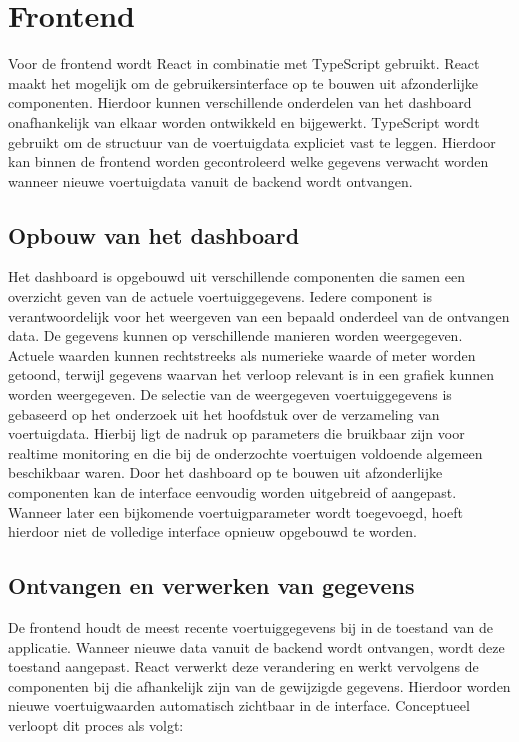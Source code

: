 \section{Frontend}
Voor de frontend wordt React in combinatie met TypeScript gebruikt. React maakt het mogelijk om de gebruikersinterface op te bouwen uit afzonderlijke componenten. Hierdoor kunnen verschillende onderdelen van het dashboard onafhankelijk van elkaar worden ontwikkeld en bijgewerkt.
TypeScript wordt gebruikt om de structuur van de voertuigdata expliciet vast te leggen. Hierdoor kan binnen de frontend worden gecontroleerd welke gegevens verwacht worden wanneer nieuwe voertuigdata vanuit de backend wordt ontvangen.

\subsection{Opbouw van het dashboard}
Het dashboard is opgebouwd uit verschillende componenten die samen een overzicht geven van de actuele voertuiggegevens. Iedere component is verantwoordelijk voor het weergeven van een bepaald onderdeel van de ontvangen data.
De gegevens kunnen op verschillende manieren worden weergegeven. Actuele waarden kunnen rechtstreeks als numerieke waarde of meter worden getoond, terwijl gegevens waarvan het verloop relevant is in een grafiek kunnen worden weergegeven.
De selectie van de weergegeven voertuiggegevens is gebaseerd op het onderzoek uit het hoofdstuk over de verzameling van voertuigdata. Hierbij ligt de nadruk op parameters die bruikbaar zijn voor realtime monitoring en die bij de onderzochte voertuigen voldoende algemeen beschikbaar waren.
Door het dashboard op te bouwen uit afzonderlijke componenten kan de interface eenvoudig worden uitgebreid of aangepast. Wanneer later een bijkomende voertuigparameter wordt toegevoegd, hoeft hierdoor niet de volledige interface opnieuw opgebouwd te worden.

\subsection{Ontvangen en verwerken van gegevens}
De frontend houdt de meest recente voertuiggegevens bij in de toestand van de applicatie. Wanneer nieuwe data vanuit de backend wordt ontvangen, wordt deze toestand aangepast.
React verwerkt deze verandering en werkt vervolgens de componenten bij die afhankelijk zijn van de gewijzigde gegevens. Hierdoor worden nieuwe voertuigwaarden automatisch zichtbaar in de interface.
Conceptueel verloopt dit proces als volgt:

